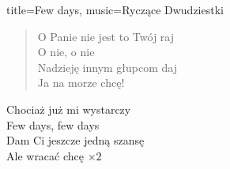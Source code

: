 \begin{song}{title={Few days}, music={Ryczące Dwudziestki}}
\begin{multicols}{2}
\begin{chorus}
    \end{chorus}
    \begin{verse}
        O Panie nie jest to Twój raj \\
		O nie, o nie \\
		Nadzieję innym głupcom daj \\
		Ja na morze chcę!
    \end{verse}
    \begin{chorus}
        Chociaż już mi wystarczy \\
		Few days, few days \\
		Dam Ci jeszcze jedną szansę \\
		Ale wracać chcę $\times 2$ 
    \end{chorus}
    \end{multicols}
\end{song}

